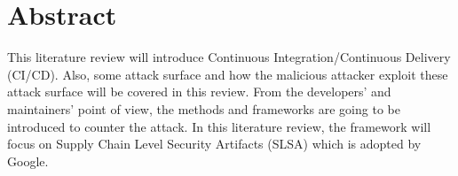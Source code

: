 \section{Abstract}

This literature review will introduce Continuous Integration/Continuous Delivery (CI/CD).
Also, some attack surface and how the malicious attacker exploit these attack surface
will be covered in this review. From the developers' and maintainers' point of view, the 
methods and frameworks are going to be introduced to counter the attack.
In this literature review, the framework will focus on Supply Chain Level Security Artifacts 
(SLSA) which is adopted by Google. 


